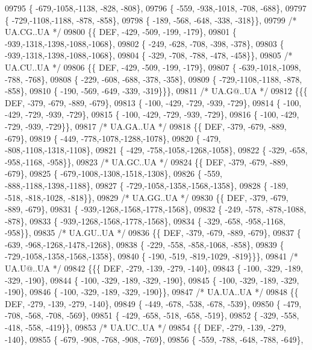 \begin{DoxyCode}
09795 \{ -679,-1058,-1138, -828, -808\},
09796 \{ -559, -938,-1018, -708, -688\},
09797 \{ -729,-1108,-1188, -878, -858\},
09798 \{ -189, -568, -648, -338, -318\}\},
09799 \textcolor{comment}{/* UA.CG..UA */}
09800 \{\{  DEF, -429, -509, -199, -179\},
09801 \{ -939,-1318,-1398,-1088,-1068\},
09802 \{ -249, -628, -708, -398, -378\},
09803 \{ -939,-1318,-1398,-1088,-1068\},
09804 \{ -329, -708, -788, -478, -458\}\},
09805 \textcolor{comment}{/* UA.CU..UA */}
09806 \{\{  DEF, -429, -509, -199, -179\},
09807 \{ -639,-1018,-1098, -788, -768\},
09808 \{ -229, -608, -688, -378, -358\},
09809 \{ -729,-1108,-1188, -878, -858\},
09810 \{ -190, -569, -649, -339, -319\}\}\},
09811 \textcolor{comment}{/* UA.G@..UA */}
09812 \{\{\{  DEF, -379, -679, -889, -679\},
09813 \{ -100, -429, -729, -939, -729\},
09814 \{ -100, -429, -729, -939, -729\},
09815 \{ -100, -429, -729, -939, -729\},
09816 \{ -100, -429, -729, -939, -729\}\},
09817 \textcolor{comment}{/* UA.GA..UA */}
09818 \{\{  DEF, -379, -679, -889, -679\},
09819 \{ -449, -778,-1078,-1288,-1078\},
09820 \{ -479, -808,-1108,-1318,-1108\},
09821 \{ -429, -758,-1058,-1268,-1058\},
09822 \{ -329, -658, -958,-1168, -958\}\},
09823 \textcolor{comment}{/* UA.GC..UA */}
09824 \{\{  DEF, -379, -679, -889, -679\},
09825 \{ -679,-1008,-1308,-1518,-1308\},
09826 \{ -559, -888,-1188,-1398,-1188\},
09827 \{ -729,-1058,-1358,-1568,-1358\},
09828 \{ -189, -518, -818,-1028, -818\}\},
09829 \textcolor{comment}{/* UA.GG..UA */}
09830 \{\{  DEF, -379, -679, -889, -679\},
09831 \{ -939,-1268,-1568,-1778,-1568\},
09832 \{ -249, -578, -878,-1088, -878\},
09833 \{ -939,-1268,-1568,-1778,-1568\},
09834 \{ -329, -658, -958,-1168, -958\}\},
09835 \textcolor{comment}{/* UA.GU..UA */}
09836 \{\{  DEF, -379, -679, -889, -679\},
09837 \{ -639, -968,-1268,-1478,-1268\},
09838 \{ -229, -558, -858,-1068, -858\},
09839 \{ -729,-1058,-1358,-1568,-1358\},
09840 \{ -190, -519, -819,-1029, -819\}\}\},
09841 \textcolor{comment}{/* UA.U@..UA */}
09842 \{\{\{  DEF, -279, -139, -279, -140\},
09843 \{ -100, -329, -189, -329, -190\},
09844 \{ -100, -329, -189, -329, -190\},
09845 \{ -100, -329, -189, -329, -190\},
09846 \{ -100, -329, -189, -329, -190\}\},
09847 \textcolor{comment}{/* UA.UA..UA */}
09848 \{\{  DEF, -279, -139, -279, -140\},
09849 \{ -449, -678, -538, -678, -539\},
09850 \{ -479, -708, -568, -708, -569\},
09851 \{ -429, -658, -518, -658, -519\},
09852 \{ -329, -558, -418, -558, -419\}\},
09853 \textcolor{comment}{/* UA.UC..UA */}
09854 \{\{  DEF, -279, -139, -279, -140\},
09855 \{ -679, -908, -768, -908, -769\},
09856 \{ -559, -788, -648, -788, -649\},

\end{DoxyCode}
